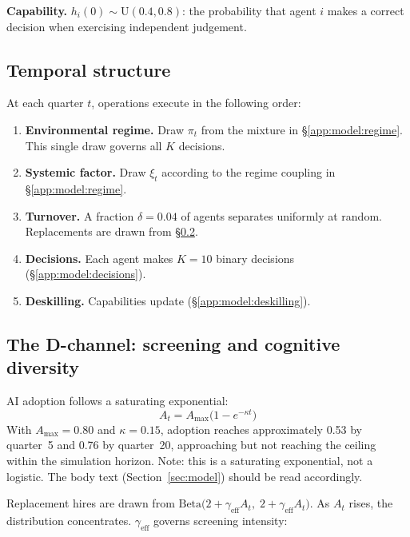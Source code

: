 \documentclass[11pt,a4paper]{article}
\begin{document}
\begin{appendices}
\textbf{Capability.}
$h_i(0) \sim \mathrm{U}(0.4, 0.8)$: the probability that agent $i$ makes a
correct decision when exercising independent judgement.

\subsection{Temporal structure}\label{app:model:temporal}

At each quarter $t$, operations execute in the following order:

\begin{enumerate}[nosep, label=(\roman*)]
  \item \textbf{Environmental regime.}
    Draw $\pi_t$ from the mixture in \S\ref{app:model:regime}. This single
    draw governs all $K$ decisions.
  \item \textbf{Systemic factor.}
    Draw $\xi_t$ according to the regime coupling in \S\ref{app:model:regime}.
  \item \textbf{Turnover.}
    A fraction $\delta = 0.04$ of agents separates uniformly at random.
    Replacements are drawn from \S\ref{app:model:screening}.
  \item \textbf{Decisions.}
    Each agent makes $K = 10$ binary decisions (\S\ref{app:model:decisions}).
  \item \textbf{Deskilling.}
    Capabilities update (\S\ref{app:model:deskilling}).
\end{enumerate}

\subsection{The D-channel: screening and cognitive
diversity}\label{app:model:screening}

AI adoption follows a saturating exponential:
\[
  A_t = A_{\max}\bigl(1 - e^{-\kappa t}\bigr)
\]
With $A_{\max} = 0.80$ and $\kappa = 0.15$, adoption reaches approximately
0.53 by quarter~5 and 0.76 by quarter~20, approaching but not reaching the
ceiling within the simulation horizon. Note: this is a saturating
exponential, not a logistic. The body text (Section~\ref{sec:model}) should
be read accordingly.

Replacement hires are drawn from
$\mathrm{Beta}\bigl(2 + \gamma_{\text{eff}} A_t,\;
2 + \gamma_{\text{eff}} A_t\bigr)$. As $A_t$ rises, the distribution
concentrates. $\gamma_{\text{eff}}$ governs screening intensity:


\end{appendices}
\end{document}
